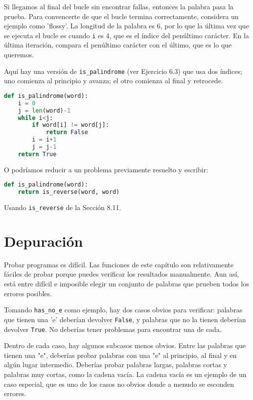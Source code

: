 Si llegamos al final del bucle sin encontrar fallas, entonces la palabra pasa la prueba. Para convencerte de que el bucle termina correctamente, considera un ejemplo como 'flossy'. La longitud de la palabra es 6, por lo que la última vez que se ejecuta el bucle es cuando \texttt{i} es 4, que es el índice del penúltimo carácter. En la última iteración, compara el penúltimo carácter con el último, que es lo que queremos.

Aquí hay una versión de \texttt{is\_palindrome} (ver Ejercicio 6.3) que usa dos índices; uno comienza al principio y avanza; el otro comienza al final y retrocede.

\begin{lstlisting}[language=Python]
def is_palindrome(word):
    i = 0
    j = len(word)-1
    while i<j:
        if word[i] != word[j]:
            return False
        i = i+1
        j = j-1
    return True
\end{lstlisting}

O podríamos reducir a un problema previamente resuelto y escribir:

\begin{lstlisting}[language=Python]
def is_palindrome(word):
    return is_reverse(word, word)
\end{lstlisting}

Usando \texttt{is\_reverse} de la Sección 8.11.

\section{Depuración}

Probar programas es difícil. Las funciones de este capítulo son relativamente fáciles de probar porque puedes verificar los resultados manualmente. Aun así, está entre difícil e imposible elegir un conjunto de palabras que prueben todos los errores posibles.

Tomando \texttt{has\_no\_e} como ejemplo, hay dos casos obvios para verificar: palabras que tienen una 'e' deberían devolver \texttt{False}, y palabras que no la tienen deberían devolver \texttt{True}. No deberías tener problemas para encontrar una de cada.

Dentro de cada caso, hay algunos subcasos menos obvios. Entre las palabras que tienen una "e", deberías probar palabras con una "e" al principio, al final y en algún lugar intermedio. Deberías probar palabras largas, palabras cortas y palabras muy cortas, como la cadena vacía. La cadena vacía es un ejemplo de un caso especial, que es uno de los casos no obvios donde a menudo se esconden errores.

